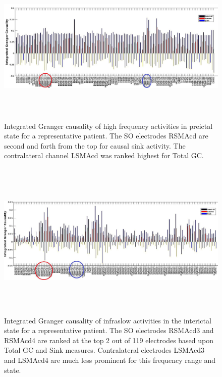 


\begin{figure}
\centerline{
	\includegraphics[height =3in]{Plots/Patient_C_preictal_high.jpg}
	}

	\caption{Integrated Granger causality of high frequency activities in preictal state for a representative patient. The SO electrodes RSMAcd are second and forth from the top for causal sink activity. The contralateral channel LSMAcd was ranked highest for Total GC.}

	\label{fig:patient_c_preictal_high}
\end{figure}


\begin{figure}
\centerline{
	\includegraphics[height =3in]{Plots/Patient_C_interictal_low.jpg}
	}

	\caption{Integrated Granger causality of infraslow activities in the interictal state for a representative patient. The SO electrodes RSMAcd3 and RSMAcd4 are ranked at the top 2 out of 119 electrodes based upon Total GC and Sink measures. Contralateral electrodes LSMAcd3 and LSMAcd4 are much less prominent for this frequency range and state.}
	\label{fig:patient_c_interictal_low}
\end{figure}

